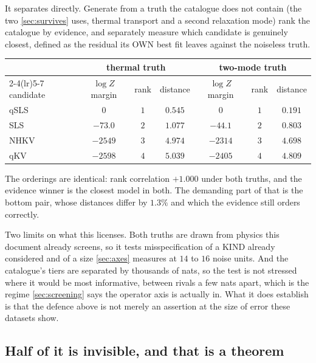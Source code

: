 \documentclass[10pt]{article}
\begin{document}
It separates directly. Generate from a truth the catalogue does not contain (the two
\cref{sec:survives} uses, thermal transport and a second relaxation mode) rank the catalogue
by evidence, and separately measure which candidate is genuinely closest, defined as the residual
its OWN best fit leaves against the noiseless truth.

\begin{center}
\begin{tabular}{lcccccc}
\toprule
& \multicolumn{3}{c}{thermal truth} & \multicolumn{3}{c}{two-mode truth} \\
\cmidrule(lr){2-4}\cmidrule(lr){5-7}
candidate & $\log Z$ margin & rank & distance & $\log Z$ margin & rank & distance \\
\midrule
qSLS & $0$ & $1$ & $\mathbf{0.545}$ & $0$ & $1$ & $\mathbf{0.191}$ \\
SLS & $-73.0$ & $2$ & $1.077$ & $-44.1$ & $2$ & $0.803$ \\
NHKV & $-2549$ & $3$ & $4.974$ & $-2314$ & $3$ & $4.698$ \\
qKV & $-2598$ & $4$ & $5.039$ & $-2405$ & $4$ & $4.809$ \\
\bottomrule
\end{tabular}
\end{center}

\noindent The orderings are identical: rank correlation $+1.000$ under both truths, and the
evidence winner is the closest model in both. The demanding part of that is the bottom pair,
whose distances differ by $1.3\%$ and which the evidence still orders correctly.

Two limits on what this licenses. Both truths are drawn from physics this document already
screens, so it tests misspecification of a KIND already considered and of a size
\cref{sec:axes} measures at $14$ to $16$ noise units. And the catalogue's tiers are separated by
thousands of nats, so the test is not stressed where it would be most informative, between
rivals a few nats apart, which is the regime \cref{sec:screening} says the operator axis is
actually in. What it does establish is that the defence above is not merely an assertion at the
size of error these datasets show.

\subsection*{Half of it is invisible, and that is a theorem}
\end{document}
